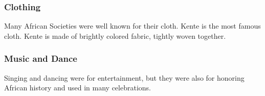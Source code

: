 \documentclass{article}
\begin{document}
\subsubsection{Clothing}
Many African Societies were well known for their cloth. Kente is the most famous cloth. Kente is made of brightly colored fabric, tightly woven together.
\subsubsection{Music and Dance}
Singing and dancing were for entertainment, but they were also for honoring African history and used in many celebrations. 
\end{document}
